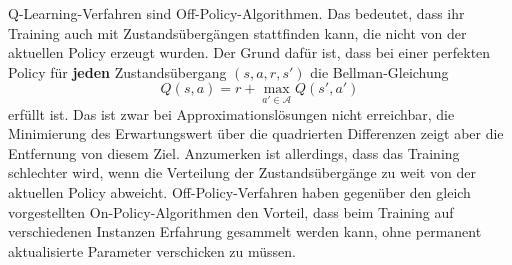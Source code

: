 Q-Learning-Verfahren sind Off-Policy-Algorithmen.
Das bedeutet, dass ihr Training auch mit Zustandsübergängen stattfinden kann, die nicht von der aktuellen Policy erzeugt wurden.
Der Grund dafür ist, dass bei einer perfekten Policy für \textbf{jeden} Zustandsübergang $(s, a, r, s')$ die Bellman-Gleichung
\begin{equation}
	Q(s, a) = r + \max_{a' \in \mathcal{A}}{Q(s', a')}
\end{equation}
erfüllt ist.
Das ist zwar bei Approximationslösungen nicht erreichbar, die Minimierung des Erwartungswert über die quadrierten Differenzen zeigt aber die Entfernung von diesem Ziel.
Anzumerken ist allerdings, dass das Training schlechter wird, wenn die Verteilung der Zustandsübergänge zu weit von der aktuellen Policy abweicht.
Off-Policy-Verfahren haben gegenüber den gleich vorgestellten On-Policy-Algorithmen den Vorteil, dass beim Training auf verschiedenen Instanzen Erfahrung gesammelt werden kann, ohne permanent aktualisierte Parameter verschicken zu müssen.

